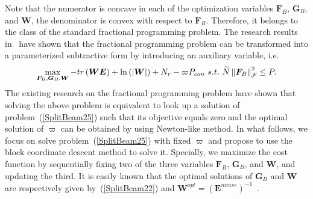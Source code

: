 \documentclass[11pt,draftcls,onecolumn]{IEEEtran}
\begin{document}
Note that the numerator is concave in each of the optimization variables $\bm{F}_{B}$, $\bm{G}_{B}$, and $\bm{W}$, the denominator is convex with respect to $\bm{F}_{B}$. Therefore, it belongs to the class of the standard fractional programming problem. The research results in~\cite{TSPPal2003,JSACPal2006,TCOMHE2013,TSPHE2014} have shown that the fractional programming problem can be transformed into a parameterized subtractive form by introducing an auxiliary variable, i.e.
\begin{equation}\label{SplitBeam25}
\max_{\bm{F}_{B},\bm{G}_{B},\bm{W}}-tr\left(\bm{W}\bm{E}\right)+\ln\left(\left|\bm{W}\right|\right)+N_{r}-\varpi P_{con}\\
~s.t.~\widetilde{N}\left\|\bm{F}_{B}\right\|_{\mathcal{F}}^{2}\leq P.
\end{equation}
The existing research on the fractional programming problem have shown that solving the above problem is equivalent to look up a solution of problem~(\ref{SplitBeam25}) such that its objective equals zero and the optimal solution of $\varpi$ can be obtained by using Newton-like method. In what follows, we focus on solve problem~(\ref{SplitBeam25}) with fixed $\varpi$ and propose to use the block coordinate descent method to solve it.  Specially, we maximize the cost function by sequentially fixing two of the three variables $\bm{F}_{B}$, $\bm{G}_{B}$, and $\bm{W}$, and updating the third. It is easily known that the optimal solutions of $\bm{G}_{B}$ and $\bm{W}$ are respectively given by~(\ref{SplitBeam22}) and $\bm{W}^{opt}=\left(\bm{E}^{mmse}\right)^{-1}$~\cite{TWCChri2008}.
\end{document}
